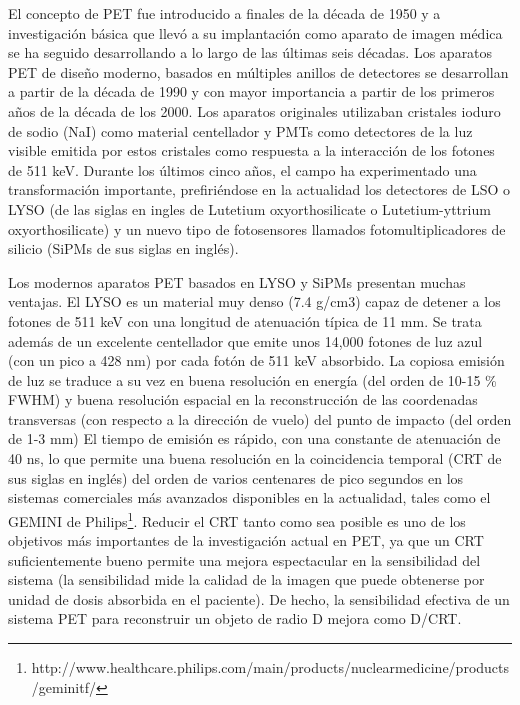 El concepto de PET fue introducido a finales de la década de 1950 y a investigación básica que llevó a su implantación como aparato de imagen médica se ha seguido desarrollando a lo largo de las últimas seis décadas. Los aparatos PET de diseño moderno, basados en múltiples anillos de detectores se desarrollan a partir de la década de 1990 y con mayor importancia a partir de los primeros años de la década de los 2000. Los aparatos originales utilizaban cristales ioduro de sodio (NaI) como material centellador y PMTs como detectores de la luz visible emitida por estos cristales como respuesta a la interacción de los fotones de 511 keV. Durante los últimos cinco años, el campo ha experimentado una transformación importante, prefiriéndose en la actualidad los detectores de LSO o LYSO (de las siglas en ingles de Lutetium oxyorthosilicate o Lutetium-yttrium oxyorthosilicate) y un nuevo tipo de fotosensores llamados fotomultiplicadores de silicio (SiPMs de sus siglas en inglés). 

Los modernos aparatos PET basados en LYSO y SiPMs presentan muchas ventajas. El LYSO es un material muy denso (7.4 g/cm3) capaz de detener a los fotones de 511 keV con una longitud de atenuación típica de 11 mm. Se trata además de un excelente centellador que emite unos 14,000 fotones de luz azul (con un pico a 428 nm) por cada fotón de 511 keV absorbido. La copiosa emisión de luz se traduce a su vez en buena resolución en energía (del orden de 10-15 \% FWHM) y buena resolución espacial en la reconstrucción de las coordenadas transversas (con respecto a la dirección de vuelo) del punto de impacto (del orden de 1-3 mm) El tiempo de emisión es rápido, con una constante de atenuación de 40 ns, lo que permite una buena resolución en la coincidencia temporal (CRT de sus siglas en inglés) del orden de varios centenares de pico segundos en los sistemas comerciales más avanzados disponibles en la actualidad, tales como el GEMINI de Philips\footnote{http://www.healthcare.philips.com/main/products/nuclearmedicine/products/geminitf/}. Reducir el CRT tanto como sea posible es uno de los objetivos más importantes de la investigación actual en PET, ya que un CRT suficientemente bueno permite una mejora espectacular en la sensibilidad del sistema (la sensibilidad mide la calidad de la imagen que puede obtenerse por unidad de dosis absorbida en el paciente).  De hecho, la sensibilidad efectiva de un sistema PET para reconstruir un objeto de radio D mejora como D/CRT. 

